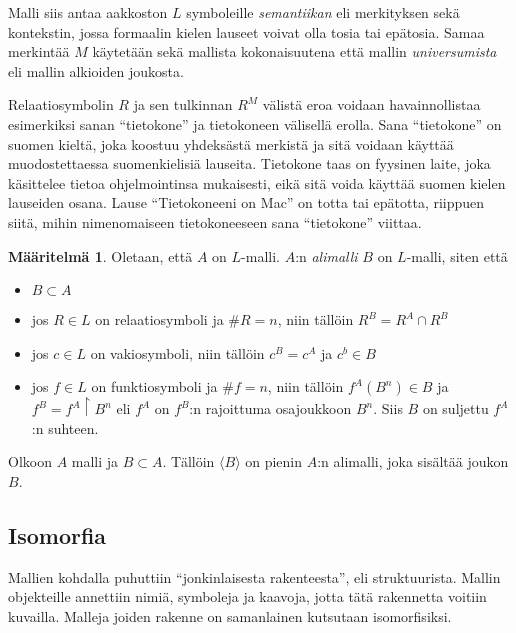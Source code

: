 \documentclass[finnish]{tktltiki2}
\theoremstyle{definition}
\newtheorem{maar}[lau]{Määritelmä}
\theoremstyle{remark}
\begin{document}
Malli siis antaa aakkoston $L$ symboleille \textit{semantiikan} eli merkityksen sekä kontekstin, jossa formaalin kielen lauseet voivat olla tosia tai epätosia. Samaa merkintää $M$ käytetään sekä mallista kokonaisuutena että mallin \textit{universumista} eli mallin alkioiden joukosta.

Relaatiosymbolin $R$ ja sen tulkinnan $R^M$ välistä eroa voidaan havainnollistaa esimerkiksi sanan ``tietokone'' ja tietokoneen välisellä erolla. Sana ``tietokone'' on suomen kieltä, joka koostuu yhdeksästä merkistä ja sitä voidaan käyttää muodostettaessa suomenkielisiä lauseita. Tietokone taas on fyysinen laite, joka käsittelee tietoa ohjelmointinsa mukaisesti, eikä sitä voida käyttää suomen kielen lauseiden osana. Lause ``Tietokoneeni on Mac'' on totta tai epätotta, riippuen siitä, mihin nimenomaiseen tietokoneeseen sana ``tietokone'' viittaa.

\begin{maar}
Oletaan, että $A$ on $L$-malli. $A$:n \textit{alimalli} $B$ on $L$-malli, siten että
\begin{itemize}
\item $B \subset A$
\item jos $R \in L$ on relaatiosymboli ja $\#R = n$, niin tällöin $R^B = R^A \cap R^B$
\item jos $c \in L$ on vakiosymboli, niin tällöin $c^B = c^A$ ja $c^b \in B$
\item jos $f \in L$ on funktiosymboli ja $\#f = n$, niin tällöin $f^A(B^n) \in B$ ja $f^B = f^A \restriction B^n$ eli $f^A$ on $f^B$:n rajoittuma osajoukkoon $B^n$. Siis $B$ on suljettu $f^A$:n suhteen.
\end{itemize}
\end{maar}

Olkoon $A$ malli ja $B \subset A$. Tällöin $\langle B \rangle$ on pienin $A$:n alimalli, joka sisältää joukon $B$. 

\subsection{Isomorfia}
Mallien kohdalla puhuttiin ``jonkinlaisesta rakenteesta'', eli struktuurista. Mallin objekteille annettiin nimiä, symboleja ja kaavoja, jotta tätä rakennetta voitiin kuvailla. Malleja joiden rakenne on samanlainen kutsutaan isomorfisiksi.
\end{document}
